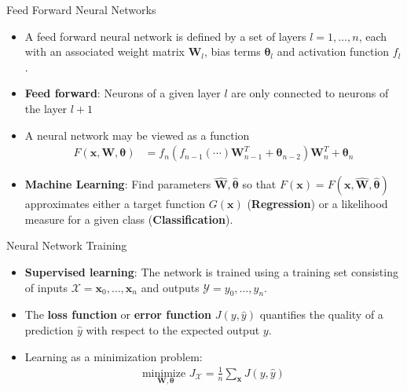 \documentclass{beamer}
\begin{document}
\begin{frame}{Feed Forward Neural Networks}
  \begin{itemize}
  \item A feed forward neural network is defined by a set of layers $l=1,\ldots,n$,
    each with an associated weight matrix $\mathbf{W}_l$, bias terms
    $\mathbf{\theta}_l$ and activation function $f_l$.
  \item \textbf{Feed forward}: Neurons of a given layer $l$ are only connected to neurons of the layer $l + 1$
  \item A neural network may be viewed as a function
    \begin{align}
      F(\mathbf{x}, \mathbf{W}, \boldsymbol{\theta}) &=
      f_{n}\left(f_{n-1}(\cdots)\mathbf{W}_{n-1}^T + \boldsymbol{\theta}_{n-2}\right) \mathbf{W}_n^T + \boldsymbol{\theta}_n
    \end{align}
  \item<2> \textbf{Machine Learning}: Find parameters $\hat{\mathbf{W}},
    \hat{\boldsymbol{\theta}}$ so that
    $F(\mathbf{x}) = F(\mathbf{x}, \hat{\mathbf{W}}, \hat{\boldsymbol{\theta}})$
    approximates either a target function $G(\mathbf{x})$ (\textbf{Regression}) or
    a likelihood measure for a given class (\textbf{Classification}).
    \end{itemize}

\end{frame}
\begin{frame}{Neural Network Training}
  \begin{itemize}
  \item \textbf{Supervised learning}: The network is trained using a training
  set consisting of inputs $\mathcal{X} = {\mathbf{x}_0,\ldots,\mathbf{x}_n}$
  and outputs $\mathcal{Y} = {y_0,\ldots,y_n}$.
  \item The \textbf{loss function} or \textbf{error function}
  $J(y, \hat{y})$ quantifies the quality of
    a prediction $\hat{y}$ with respect to the expected output $y$.
  \item Learning as a minimization problem:
    \begin{align}
      \underset{\mathbf{W},\boldsymbol{\theta}}{\text{minimize }}
         J_\mathcal{X} = \frac{1}{n}\sum_{\mathbf{x}} J(y, \hat{y})
      \end{align}
 \end{itemize}
 \end{frame}
\end{document}
